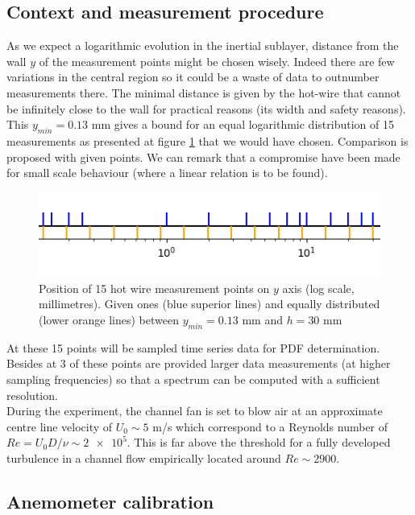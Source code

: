 \documentclass[12pt]{article}
\begin{document}
\subsection{Context and measurement procedure}



As we expect a logarithmic evolution in the inertial sublayer, distance from the wall $y$ of the measurement points might be chosen wisely. Indeed there are few variations in the central region so it could be a waste of data to outnumber measurements there. The minimal distance is given by the hot-wire that cannot be infinitely close to the wall for practical reasons (its width and safety reasons). This $y_{min} = 0.13$ \si{mm} gives a bound for an equal logarithmic distribution of 15 measurements as presented at figure \ref{fig:mes_points} that we would have chosen. Comparison is proposed with given points. We can remark that a compromise have been made for small scale behaviour (where a linear relation is to be found).\\

\begin{figure}[h!]
    \centering
    \includegraphics[width=0.4\linewidth]{Python/Lab_mes_points_zoom.png}
    \caption{Position of 15 hot wire measurement points on $y$ axis (log scale, millimetres). Given ones (blue superior lines) and equally distributed (lower orange lines) between $y_{min} = 0.13$ \si{mm} and $h = 30$ \si{mm}}
    \label{fig:mes_points}
\end{figure}

At these 15 points will be sampled time series data for PDF determination. Besides at 3 of these points are provided larger data measurements (at higher sampling frequencies) so that a spectrum can be computed with a sufficient resolution.\\

During the experiment, the channel fan is set to blow air at an approximate centre line velocity of $U_0 \sim 5$ \si{m/s} which correspond to a Reynolds number of $Re = U_0 D/\nu \sim \num{2e5}$. This is far above the threshold for a fully developed turbulence in a channel flow empirically located around $Re \sim 2900$. 


\subsection{Anemometer calibration}
\end{document}
